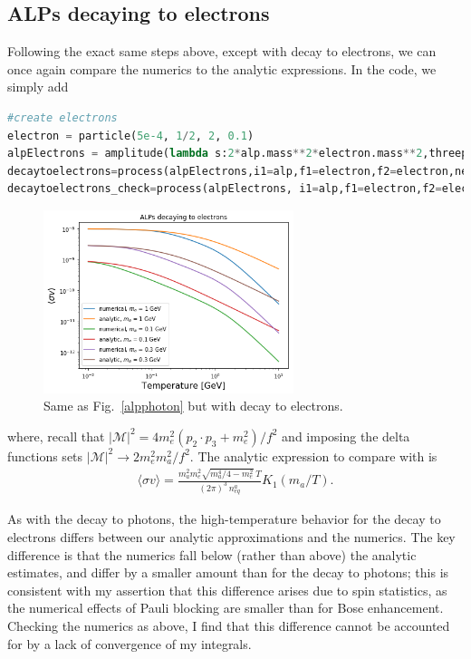 \documentclass[superscriptaddress,nofootinbib,notitlepage,onecolumn]{revtex4-1}
\newcommand{\beq}{\begin{eqnarray}}
\newcommand{\eeq}{\end{eqnarray}}
\newcommand{\abs}[1]{\left| #1 \right|}
\begin{document}
\subsection{ALPs decaying to electrons}
Following the exact same steps above, except with decay to electrons, we can once again compare the numerics to the analytic expressions. In the code, we simply add 
\begin{lstlisting}[language=Python]
#create electrons
electron = particle(5e-4, 1/2, 2, 0.1)
alpElectrons = amplitude(lambda s:2*alp.mass**2*electron.mass**2,threept=True)
decaytoelectrons=process(alpElectrons,i1=alp,f1=electron,f2=electron,nevals=3e3)
decaytoelectrons_check=process(alpElectrons, i1=alp,f1=electron,f2=electron, analytic=True)
\end{lstlisting}
 \begin{figure}[h!]
\includegraphics[width=0.65\textwidth]{electrondecay.png}
\caption{Same as Fig.~\ref{alpphoton} but with decay to electrons.}
\end{figure}
where, recall that $\abs{\mathcal{M}}^2  = 4 m_e^2 (p_2\cdot p_3 + m_e^2)/f^2$ and imposing the delta functions sets $\abs{\mathcal{M}}^2 \rightarrow 2 m_e^2 m_a^2/f^2$. The analytic expression to compare with is \beq \langle \sigma v \rangle =  \frac{m_a^2 m_e^2 \sqrt{m_a^4/4 - m_e^2}~ T}{(2 \pi)^3 \,n^a_{eq}} K_1(m_a/T).\eeq

As with the decay to photons, the high-temperature behavior for the decay to electrons differs between our analytic approximations and the numerics. The key difference is that the numerics fall below (rather than above) the analytic estimates, and differ by a smaller amount than for the decay to photons; this is consistent with my assertion that this difference arises due to spin statistics, as the numerical effects of Pauli blocking are smaller than for Bose enhancement. Checking the numerics as above, I find that this difference cannot be accounted for by a lack of convergence of my integrals.
\end{document}
